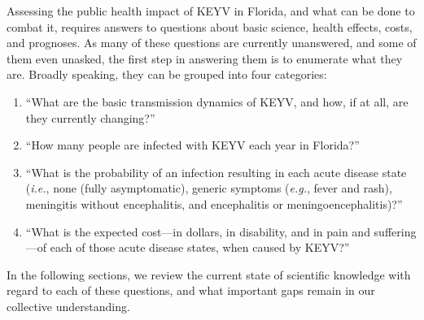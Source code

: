 \documentclass[12pt]{article}
\newcommand{\eg}{\textit{e.g.}}
\newcommand{\ie}{\textit{i.e.}}
\begin{document}

        Assessing the public health impact of KEYV in Florida, and what can be done to combat it, requires answers to questions about basic science, health effects, costs, and prognoses. As many of these questions are currently unanswered, and some of them even unasked, the first step in answering them is to enumerate what they are. Broadly speaking, they can be grouped into four categories:
        \begin{enumerate}
            \item ``What are the basic transmission dynamics of KEYV, and how, if at all, are they currently changing?''
            \item ``How many people are infected with KEYV each year in Florida?''
            \item ``What is the probability of an infection resulting in each acute disease state (\ie, none (fully asymptomatic), generic symptoms (\eg, fever and rash), meningitis without encephalitis, and encephalitis or meningoencephalitis)?''
            \item ``What is the expected cost---in dollars, in disability, and in pain and suffering---of each of those acute disease states, when caused by KEYV?''
        \end{enumerate}

        In the following sections, we review the current state of scientific knowledge with regard to each of these questions, and what important gaps remain in our collective understanding.
\end{document}
